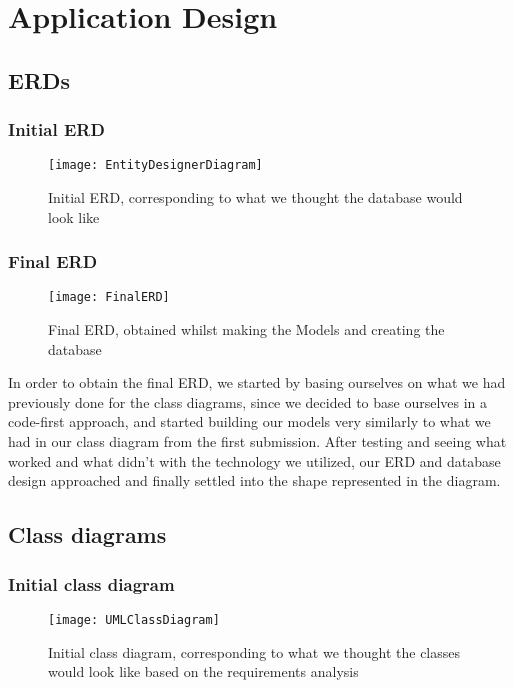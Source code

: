 \chapter{Application Design}

\section{ERDs}
\subsection{Initial ERD}
\begin{figure}[ht]
    \centering
    \texttt{[image: EntityDesignerDiagram]}
    \caption{Initial ERD, corresponding to what we thought the database would look like}
  \end{figure}

\subsection{Final ERD}
\begin{figure}[ht]
    \centering
    \texttt{[image: FinalERD]}
    \caption{Final ERD, obtained whilst making the Models and creating the database}
  \end{figure}

In order to obtain the final ERD, we started by basing ourselves on what we had previously done for
the class diagrams, since we decided to base ourselves in a code-first approach, and started building
our models very similarly to what we had in our class diagram from the first submission. After testing
and seeing what worked and what didn't with the technology we utilized, our ERD and database design
approached and finally settled into the shape represented in the diagram.

\clearpage
\section{Class diagrams}
\subsection{Initial class diagram}
\begin{figure}[ht]
    \centering
    \texttt{[image: UMLClassDiagram]}
    \caption{Initial class diagram, corresponding to what we thought
    the classes would look like based on the requirements analysis}
  \end{figure}

